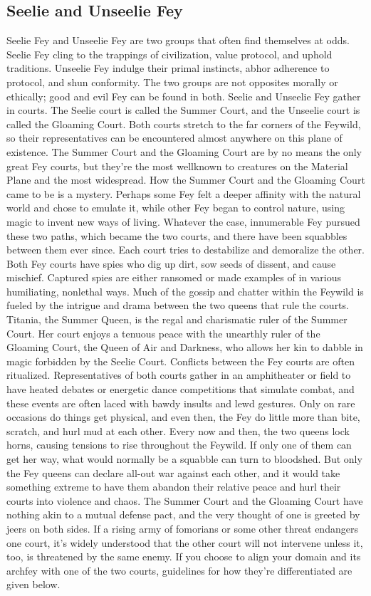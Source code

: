 \documentclass[10pt,a4paper,twoside,twocolumn,openany,nodeprecatedcode,bg=print]{dndbook}
\begin{document}
\subsection{Seelie and Unseelie Fey}
Seelie Fey and Unseelie Fey are two groups that often find themselves at odds. Seelie Fey cling to the trappings of civilization, value protocol, and uphold traditions. Unseelie Fey indulge their primal instincts, abhor adherence to protocol, and shun conformity. The two groups are not opposites morally or ethically; good and evil Fey can be found in both.
Seelie and Unseelie Fey gather in courts. The Seelie court is called the Summer Court, and the Unseelie court is called the Gloaming Court. Both courts stretch to the far corners of the Feywild, so their representatives can be encountered almost anywhere on this plane of existence. The Summer Court and the Gloaming Court are by no means the only great Fey courts, but they're the most wellknown to creatures on the Material Plane and the most widespread.
How the Summer Court and the Gloaming Court came to be is a mystery. Perhaps some Fey felt a deeper affinity with the natural world and chose to emulate it, while other Fey began to control nature, using magic to invent new ways of living. Whatever the case, innumerable Fey pursued these two paths, which became the two courts, and there have been squabbles between them ever since.
Each court tries to destabilize and demoralize the other. Both Fey courts have spies who dig up dirt, sow seeds of dissent, and cause mischief. Captured spies are either ransomed or made examples of in various humiliating, nonlethal ways.
Much of the gossip and chatter within the Feywild is fueled by the intrigue and drama between the two queens that rule the courts. Titania, the Summer Queen, is the regal and charismatic ruler of the Summer Court. Her court enjoys a tenuous peace with the unearthly ruler of the Gloaming Court, the Queen of Air and Darkness, who allows her kin to dabble in magic forbidden by the Seelie Court.
Conflicts between the Fey courts are often ritualized. Representatives of both courts gather in an amphitheater or field to have heated debates or energetic dance competitions that simulate combat, and these events are often laced with bawdy insults and lewd gestures. Only on rare occasions do things get physical, and even then, the Fey do little more than bite, scratch, and hurl mud at each other.
Every now and then, the two queens lock horns, causing tensions to rise throughout the Feywild. If only one of them can get her way, what would normally be a squabble can turn to bloodshed. But only the Fey queens can declare all-out war against each other, and it would take something extreme to have them abandon their relative peace and hurl their courts into violence and chaos.
The Summer Court and the Gloaming Court have nothing akin to a mutual defense pact, and the very thought of one is greeted by jeers on both sides. If a rising army of fomorians or some other threat endangers one court, it's widely understood that the other court will not intervene unless it, too, is threatened by the same enemy.
If you choose to align your domain and its archfey with one of the two courts, guidelines for how they're differentiated are given below.
\end{document}
